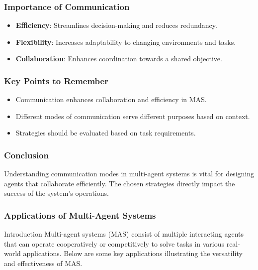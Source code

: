 \documentclass[aspectratio=169]{beamer}
\begin{document}
\begin{frame}[fragile]
    \frametitle{Importance of Communication}
    \begin{itemize}
        \item \textbf{Efficiency}: Streamlines decision-making and reduces redundancy.
        \item \textbf{Flexibility}: Increases adaptability to changing environments and tasks.
        \item \textbf{Collaboration}: Enhances coordination towards a shared objective.
    \end{itemize}
\end{frame}

\begin{frame}[fragile]
    \frametitle{Key Points to Remember}
    \begin{itemize}
        \item Communication enhances collaboration and efficiency in MAS.
        \item Different modes of communication serve different purposes based on context.
        \item Strategies should be evaluated based on task requirements.
    \end{itemize}
\end{frame}

\begin{frame}[fragile]
    \frametitle{Conclusion}
    Understanding communication modes in multi-agent systems is vital for designing agents that collaborate efficiently. The chosen strategies directly impact the success of the system's operations.
\end{frame}

\begin{frame}[fragile]
    \frametitle{Applications of Multi-Agent Systems}
    \begin{block}{Introduction}
        Multi-agent systems (MAS) consist of multiple interacting agents that can operate cooperatively or competitively to solve tasks in various real-world applications. Below are some key applications illustrating the versatility and effectiveness of MAS.
    \end{block}
\end{frame}
\end{document}

